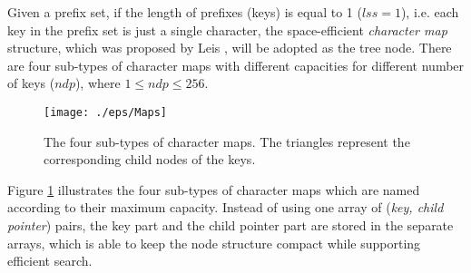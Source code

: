 \documentclass{article}
\begin{document}
Given a prefix set, if the length of prefixes (keys) is equal to 1 ($lss=1$),
i.e. each key in the prefix set is just a single character, the
space-efficient \emph{character map} structure, which was proposed by
Leis \cite{Leis2013}, will be adopted as the tree node. There are four
sub-types of character maps with different capacities for different
number of keys ($ndp$), where $1 \leq ndp \leq 256$.

\begin{figure}[htbp]
  \centering
  \texttt{[image: ./eps/Maps]}
  \caption{The four sub-types of character maps. The triangles
    represent the corresponding child nodes of the keys.}
  \label{fig:character map}
\end{figure}

Figure \ref{fig:character map} illustrates the four sub-types of
character maps which are named according to their maximum
capacity. Instead of using one array of (\emph{key, child pointer})
pairs, the key part and the child pointer part are stored in the
separate arrays, which is able to keep the node structure compact
while supporting efficient search.
\end{document}

